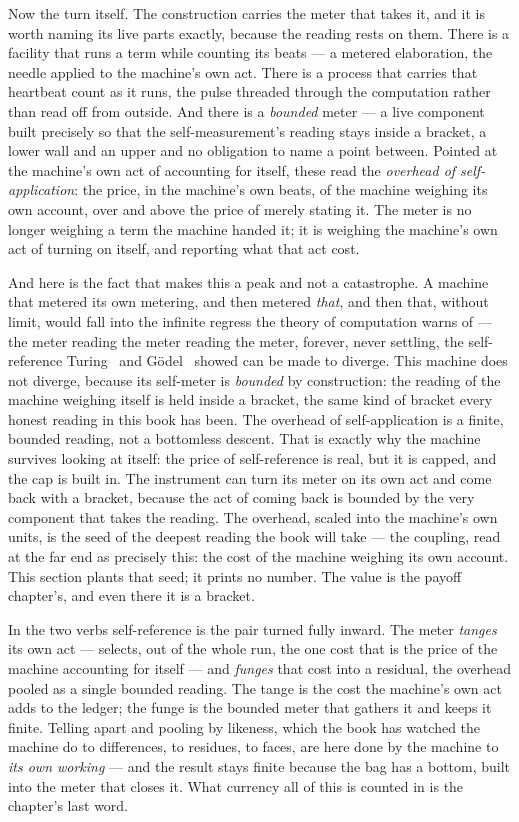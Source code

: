 Now the turn itself. The construction carries the meter that takes it, and it is worth naming its live parts exactly,
because the reading rests on them. There is a facility that runs a term while counting its beats --- a metered
elaboration, the needle applied to the machine's own act. There is a process that carries that heartbeat count as it
runs, the pulse threaded through the computation rather than read off from outside. And there is a \emph{bounded} meter ---
a live component built precisely so that the self-measurement's reading stays inside a bracket, a lower wall and an
upper and no obligation to name a point between. Pointed at the machine's own act of accounting for itself, these read
the \emph{overhead of self-application}: the price, in the machine's own beats, of the machine weighing its own account,
over and above the price of merely stating it. The meter is no longer weighing a term the machine handed it; it is
weighing the machine's own act of turning on itself, and reporting what that act cost.

And here is the fact that makes this a peak and not a catastrophe. A machine that metered its own metering, and then
metered \emph{that}, and then that, without limit, would fall into the infinite regress the theory of computation warns
of --- the meter reading the meter reading the meter, forever, never settling, the self-reference Turing~\cite{turing1936}
and G\"odel~\cite{godel1931} showed can be made to diverge. This machine does not diverge, because its self-meter is
\emph{bounded} by construction: the reading of the machine weighing itself is held inside a bracket, the same kind of
bracket every honest reading in this book has been. The overhead of self-application is a finite, bounded reading, not a
bottomless descent. That is exactly why the machine survives looking at itself: the price of self-reference is real, but
it is capped, and the cap is built in. The instrument can turn its meter on its own act and come back with a bracket,
because the act of coming back is bounded by the very component that takes the reading. The overhead, scaled into the
machine's own units, is the seed of the deepest reading the book will take --- the coupling, read at the far end as
precisely this: the cost of the machine weighing its own account. This section plants that seed; it prints no number. The
value is the payoff chapter's, and even there it is a bracket.

In the two verbs self-reference is the pair turned fully inward. The meter \emph{tanges} its own act --- selects, out of
the whole run, the one cost that is the price of the machine accounting for itself --- and \emph{funges} that cost into a
residual, the overhead pooled as a single bounded reading. The tange is the cost the machine's own act adds to the
ledger; the funge is the bounded meter that gathers it and keeps it finite. Telling apart and pooling by likeness, which
the book has watched the machine do to differences, to residues, to faces, are here done by the machine to \emph{its own
working} --- and the result stays finite because the bag has a bottom, built into the meter that closes it. What currency
all of this is counted in is the chapter's last word.

